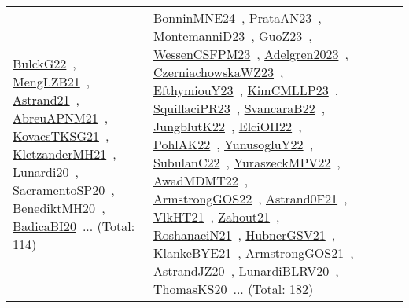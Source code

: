 {\begin{longtable}{lp{3cm}>{\raggedright\arraybackslash}p{6cm}>{\raggedright\arraybackslash}p{6cm}>{\raggedright\arraybackslash}p{8cm}}
\href{../works/BulckG22.pdf}{BulckG22}~\cite{BulckG22}, \href{../works/MengLZB21.pdf}{MengLZB21}~\cite{MengLZB21}, \href{../works/Astrand21.pdf}{Astrand21}~\cite{Astrand21}, \href{../works/AbreuAPNM21.pdf}{AbreuAPNM21}~\cite{AbreuAPNM21}, \href{../works/KovacsTKSG21.pdf}{KovacsTKSG21}~\cite{KovacsTKSG21}, \href{../works/KletzanderMH21.pdf}{KletzanderMH21}~\cite{KletzanderMH21}, \href{../works/Lunardi20.pdf}{Lunardi20}~\cite{Lunardi20}, \href{../works/SacramentoSP20.pdf}{SacramentoSP20}~\cite{SacramentoSP20}, \href{../works/BenediktMH20.pdf}{BenediktMH20}~\cite{BenediktMH20}, \href{../works/BadicaBI20.pdf}{BadicaBI20}~\cite{BadicaBI20}... (Total: 114) & \href{../works/BonninMNE24.pdf}{BonninMNE24}~\cite{BonninMNE24}, \href{../works/PrataAN23.pdf}{PrataAN23}~\cite{PrataAN23}, \href{../works/MontemanniD23.pdf}{MontemanniD23}~\cite{MontemanniD23}, \href{../works/GuoZ23.pdf}{GuoZ23}~\cite{GuoZ23}, \href{../works/WessenCSFPM23.pdf}{WessenCSFPM23}~\cite{WessenCSFPM23}, \href{../works/Adelgren2023.pdf}{Adelgren2023}~\cite{Adelgren2023}, \href{../works/CzerniachowskaWZ23.pdf}{CzerniachowskaWZ23}~\cite{CzerniachowskaWZ23}, \href{../works/EfthymiouY23.pdf}{EfthymiouY23}~\cite{EfthymiouY23}, \href{../works/KimCMLLP23.pdf}{KimCMLLP23}~\cite{KimCMLLP23}, \href{../works/SquillaciPR23.pdf}{SquillaciPR23}~\cite{SquillaciPR23}, \href{../works/SvancaraB22.pdf}{SvancaraB22}~\cite{SvancaraB22}, \href{../works/JungblutK22.pdf}{JungblutK22}~\cite{JungblutK22}, \href{../works/ElciOH22.pdf}{ElciOH22}~\cite{ElciOH22}, \href{../works/PohlAK22.pdf}{PohlAK22}~\cite{PohlAK22}, \href{../works/YunusogluY22.pdf}{YunusogluY22}~\cite{YunusogluY22}, \href{../works/SubulanC22.pdf}{SubulanC22}~\cite{SubulanC22}, \href{../works/YuraszeckMPV22.pdf}{YuraszeckMPV22}~\cite{YuraszeckMPV22}, \href{../works/AwadMDMT22.pdf}{AwadMDMT22}~\cite{AwadMDMT22}, \href{../works/ArmstrongGOS22.pdf}{ArmstrongGOS22}~\cite{ArmstrongGOS22}, \href{../works/Astrand0F21.pdf}{Astrand0F21}~\cite{Astrand0F21}, \href{../works/VlkHT21.pdf}{VlkHT21}~\cite{VlkHT21}, \href{../works/Zahout21.pdf}{Zahout21}~\cite{Zahout21}, \href{../works/RoshanaeiN21.pdf}{RoshanaeiN21}~\cite{RoshanaeiN21}, \href{../works/HubnerGSV21.pdf}{HubnerGSV21}~\cite{HubnerGSV21}, \href{../works/KlankeBYE21.pdf}{KlankeBYE21}~\cite{KlankeBYE21}, \href{../works/ArmstrongGOS21.pdf}{ArmstrongGOS21}~\cite{ArmstrongGOS21}, \href{../works/AstrandJZ20.pdf}{AstrandJZ20}~\cite{AstrandJZ20}, \href{../works/LunardiBLRV20.pdf}{LunardiBLRV20}~\cite{LunardiBLRV20}, \href{../works/ThomasKS20.pdf}{ThomasKS20}~\cite{ThomasKS20}... (Total: 182)\\

\end{longtable}}
